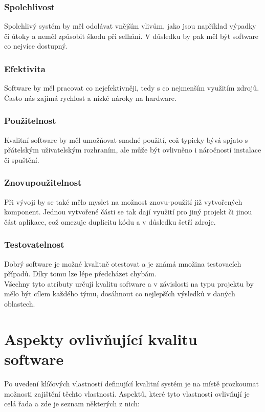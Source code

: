 		\subsubsection{Spolehlivost}
			Spolehlivý systém by měl odolávat vnějším vlivům, jako jsou například výpadky či útoky a neměl způsobit škodu při selhání. V důsledku by pak měl být software co nejvíce dostupný.
		
		\subsubsection{Efektivita}
			Software by měl pracovat co nejefektivněji, tedy s co nejmenším využitím zdrojů. Často nás zajímá rychlost a nízké nároky na hardware.
		
		\subsubsection{Použitelnost}
			Kvalitní software by měl umožňovat snadné použití, což typicky bývá spjato s přátelským uživatelským rozhraním, ale může být ovlivněno i náročností instalace či spuštění.
		
		\subsubsection{Znovupoužitelnost}
			Při vývoji by se také mělo myslet na možnost znovu-použití již vytvořených komponent. Jednou vytvořené části se tak dají využití pro jiný projekt či jinou část aplikace, což omezuje duplicitu kódu a v důsledku šetří zdroje.
		
		\subsubsection{Testovatelnost}
			Dobrý software je možné kvalitně otestovat a je známá množina testovacích případů. Díky tomu lze lépe předcházet chybám.\\

Všechny tyto atributy určují kvalitu software a v závislosti na typu projektu by mělo být cílem každého týmu, dosáhnout co nejlepších výsledků v daných oblastech. 


\section{Aspekty ovlivňující kvalitu software}
Po uvedení klíčových vlastností definující kvalitní systém je na místě prozkoumat možnosti zajištění těchto vlastností. Aspektů, které tyto vlastnosti ovlivňují je celá řada a zde je seznam některých z nich:

